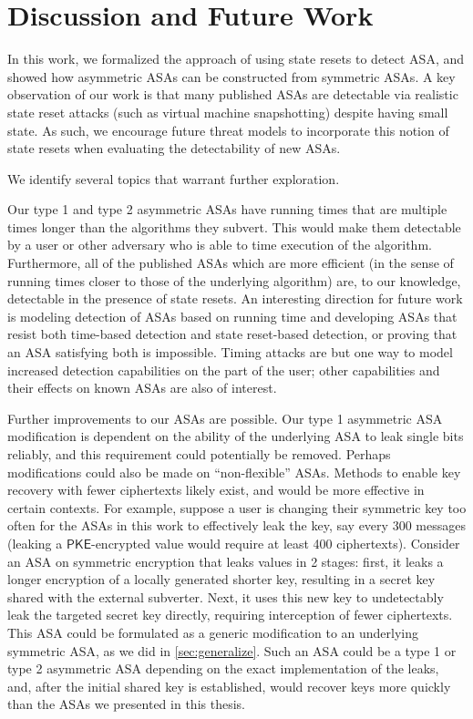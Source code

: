 \chapter{Discussion and Future Work}
In this work, we formalized the approach of using state resets to detect ASA, and showed how asymmetric ASAs can be constructed from symmetric ASAs. A key observation of our work is that many published ASAs are detectable via realistic state reset attacks (such as virtual machine snapshotting) despite having small state.  As such, we encourage future threat models to incorporate this notion of state resets when evaluating the detectability of new ASAs.

We identify several topics that warrant further exploration.

Our type 1 and type 2 asymmetric ASAs have running times that are multiple times longer than the algorithms they subvert. This would make them detectable by a user or other adversary who is able to time execution of the algorithm. Furthermore, all of the published ASAs which are more efficient (in the sense of running times closer to those of the underlying algorithm) are, to our knowledge, detectable in the presence of state resets. An interesting direction for future work is modeling detection of ASAs based on running time and developing ASAs that resist both time-based detection and state reset-based detection, or proving that an ASA satisfying both is impossible. Timing attacks are but one way to model increased detection capabilities on the part of the user; other capabilities and their effects on known ASAs are also of interest.

Further improvements to our ASAs are possible. Our type 1 asymmetric ASA modification is dependent on the ability of the underlying ASA to leak single bits reliably, and this requirement could potentially be removed. Perhaps modifications could also be made on ``non-flexible'' ASAs. Methods to enable key recovery with fewer ciphertexts likely exist, and would be more effective in certain contexts. For example, suppose a user is changing their symmetric key too often for the ASAs in this work to effectively leak the key, say every 300 messages (leaking a $\mathsf{PKE}$-encrypted value would require at least 400 ciphertexts). Consider an ASA on symmetric encryption that leaks values in 2 stages: first, it leaks a longer encryption of a locally generated shorter key, resulting in a secret key shared with the external subverter. Next, it uses this new key to undetectably leak the targeted secret key directly, requiring interception of fewer ciphertexts. This ASA could be formulated as a generic modification to an underlying symmetric ASA, as we did in \autoref{sec:generalize}. Such an ASA could be a type 1 or type 2 asymmetric ASA depending on the exact implementation of the leaks, and, after the initial shared key is established, would recover keys more quickly than the ASAs we presented in this thesis.


